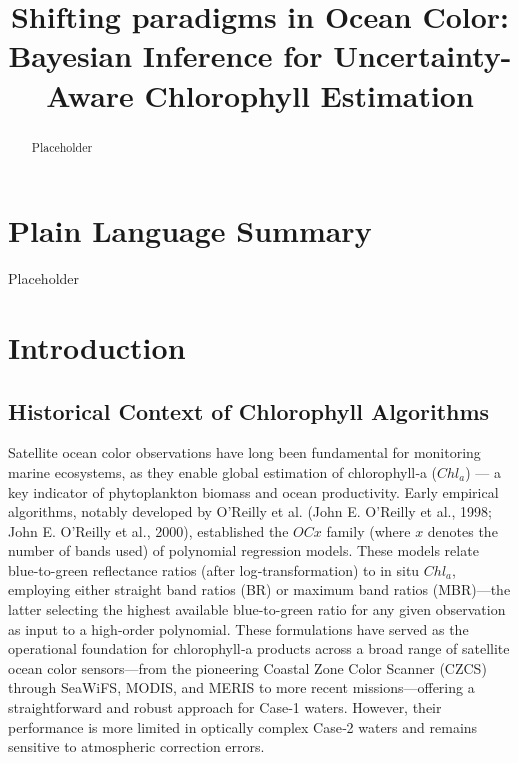 \documentclass[
]{agujournal2019}
\begin{document}
\title{Shifting paradigms in Ocean Color: Bayesian Inference for
Uncertainty-Aware Chlorophyll Estimation}



\begin{abstract}
Placeholder
\end{abstract}

\section*{Plain Language Summary}
Placeholder




\section{Introduction}\label{introduction}

\subsection{Historical Context of Chlorophyll
Algorithms}\label{historical-context-of-chlorophyll-algorithms}

Satellite ocean color observations have long been fundamental for
monitoring marine ecosystems, as they enable global estimation of
chlorophyll‑a (\(Chl_a\)) --- a key indicator of phytoplankton biomass
and ocean productivity. Early empirical algorithms, notably developed by
O'Reilly et al. (John E. O'Reilly et al., 1998; John E. O'Reilly et al.,
2000), established the \(OCx\) family (where \(x\) denotes the number of
bands used) of polynomial regression models. These models relate
blue-to-green reflectance ratios (after log‑transformation) to in situ
\(Chl_a\), employing either straight band ratios (BR) or maximum band
ratios (MBR)---the latter selecting the highest available blue-to-green
ratio for any given observation as input to a high‑order polynomial.
These formulations have served as the operational foundation for
chlorophyll‑a products across a broad range of satellite ocean color
sensors---from the pioneering Coastal Zone Color Scanner (CZCS) through
SeaWiFS, MODIS, and MERIS to more recent missions---offering a
straightforward and robust approach for Case‑1 waters. However, their
performance is more limited in optically complex Case‑2 waters and
remains sensitive to atmospheric correction errors.
\end{document}
